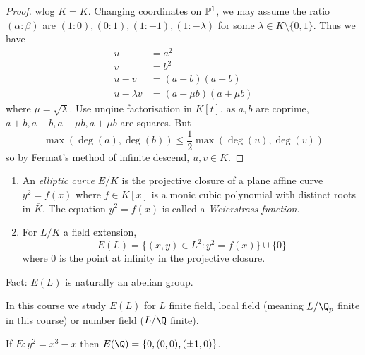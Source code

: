 \documentclass[a4paper]{article}
\begin{document}
\begin{proof}
  wlog \(K = \overline K\). Changing coordinates on \(\P^1\), we may assume the ratio \((\alpha: \beta)\) are \((1: 0), (0: 1), (1: -1), (1: -\lambda)\) for some \(\lambda \in K \setminus \{0, 1\}\). Thus we have
  \begin{align*}
    u &= a^2 \\
    v &= b^2 \\
    u - v &= (a - b)(a + b) \\
    u - \lambda v &= (a - \mu b)(a + \mu b)
  \end{align*}
  where \(\mu = \sqrt \lambda\). Use unqiue factorisation in \(K[t]\),  as \(a, b\) are coprime, \(a + b, a - b, a - \mu b, a + \mu b\) are squares. But
  \[
    \max (\deg (a), \deg (b)) \leq \frac{1}{2} \max (\deg (u), \deg (v))
  \]
  so by Fermat's method of infinite descend, \(u, v \in K\).
\end{proof}

\begin{definition}\leavevmode
  \begin{enumerate}
  \item An \emph{elliptic curve} \(E/K\) is the projective closure of a plane affine curve \(y^2 = f(x)\) where \(f \in K[x]\) is a monic cubic polynomial with distinct roots in \(\overline K\). The equation \(y^2 = f(x)\) is called a \emph{Weierstrass function}.
  \item For \(L/K\) a field extension,
    \[
      E(L) = \{(x, y) \in L^2: y^2 = f(x)\} \cup \{0\}
    \]
    where \(0\) is the point at infinity in the projective closure.
  \end{enumerate}
\end{definition}

Fact: \(E(L)\) is naturally an abelian group.

In this course we study \(E(L)\) for \(L\) finite field, local field (meaning \(L/\Q_p\) finite in this course) or number field (\(L/\Q\) finite).

\begin{theorem}
  If \(E: y^2 = x^3 - x\) then \(E(\Q) = \{0, (0, 0), (\pm 1, 0)\}\).
\end{theorem}

\printindex
\end{document}
